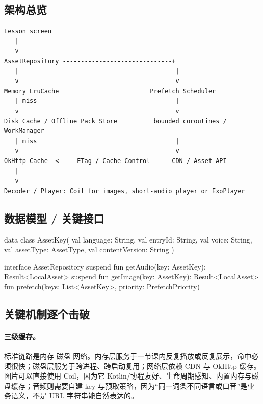 \subsection{架构总览}

\begin{lstlisting}
Lesson screen
   |
   v
AssetRepository ------------------------------+
   |                                           |
   v                                           v
Memory LruCache                         Prefetch Scheduler
   | miss                                      |
   v                                           v
Disk Cache / Offline Pack Store          bounded coroutines / WorkManager
   | miss                                      |
   v                                           v
OkHttp Cache  <---- ETag / Cache-Control ---- CDN / Asset API
   |
   v
Decoder / Player: Coil for images, short-audio player or ExoPlayer
\end{lstlisting}

\subsection{数据模型 / 关键接口}

\begin{kotlin}
data class AssetKey(
    val language: String,
    val entryId: String,
    val voice: String,
    val assetType: AssetType,
    val contentVersion: String
)

interface AssetRepository {
    suspend fun getAudio(key: AssetKey): Result<LocalAsset>
    suspend fun getImage(key: AssetKey): Result<LocalAsset>
    fun prefetch(keys: List<AssetKey>, priority: PrefetchPriority)
}
\end{kotlin}

\subsection{关键机制逐个击破}

\paragraph{三级缓存。} \srcinferred 标准链路是内存  磁盘  网络。内存层服务于一节课内反复播放或反复展示，命中必须很快；磁盘层服务于跨进程、跨启动复用；网络层依赖 CDN 与 OkHttp 缓存。图片可以直接使用 Coil，因为它 Kotlin/协程友好、生命周期感知、内置内存与磁盘缓存；音频则需要自建 key 与预取策略，因为“同一词条不同语言或口音”是业务语义，不是 URL 字符串能自然表达的。


